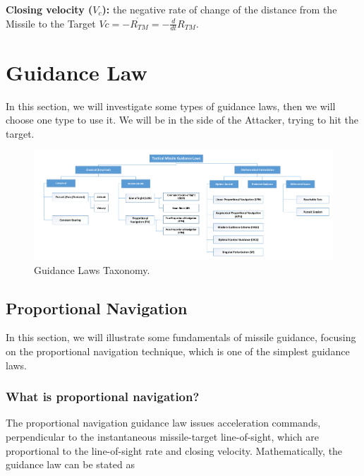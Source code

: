 \textbf{Closing velocity ($V_c$):} the negative rate of change of the distance
from the Missile to the Target $Vc= -\dot{R_{TM}}=-\frac{d}{dt} R_{TM} $.


\section{Guidance Law}


In this section, we will investigate some types of guidance laws, then we will choose one type to use it. We will be in the side of the Attacker, trying to hit the target.
\begin{landscape}
\begin{figure}[H]
	\centering
	\includegraphics[scale = 0.5]{fig/GuidanceLaws.pdf}
	\caption{Guidance Laws Taxonomy.}
\end{figure}
\end{landscape}

\subsection{Proportional Navigation}
In this section, we will illustrate some fundamentals of missile guidance, focusing on the proportional navigation technique, which is one of the simplest guidance laws.

\subsubsection*{What is proportional navigation?}
The proportional navigation guidance law issues acceleration commands,
perpendicular to the instantaneous missile-target line-of-sight, which are
proportional to the line-of-sight rate and closing velocity. Mathematically, the
guidance law can be stated as

